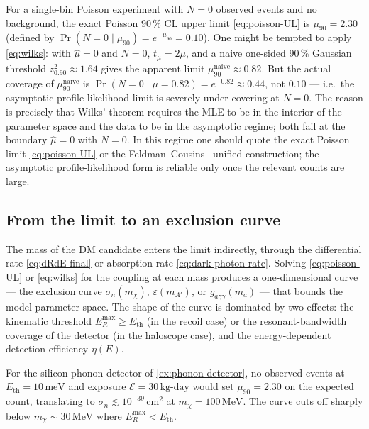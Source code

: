 \begin{example}
\label{ex:limits-compare}
For a single-bin Poisson experiment with $N=0$ observed events
and no background, the exact Poisson 90\,\% CL upper limit
\cref{eq:poisson-UL} is $\mu_{90}=2.30$ (defined by
$\Pr(N=0\mid\mu_{90})=e^{-\mu_{90}}=0.10$). One might be tempted
to apply \cref{eq:wilks}: with $\hat\mu=0$ and $N=0$,
$t_\mu=2\mu$, and a naive one-sided 90\,\% Gaussian threshold
$z_{0.90}^2\approx 1.64$ gives the apparent limit
$\mu_{90}^{\text{naive}}\approx 0.82$. But the actual coverage
of $\mu_{90}^{\text{naive}}$ is
$\Pr(N=0\mid\mu=0.82)=e^{-0.82}\approx 0.44$, not $0.10$ ---
i.e.\ the asymptotic profile-likelihood limit is severely
under-covering at $N=0$. The reason is precisely that Wilks'
theorem requires the MLE to be in the interior of the parameter
space and the data to be in the asymptotic regime; both fail at
the boundary $\hat\mu=0$ with $N=0$. In this regime one should
quote the exact Poisson limit \cref{eq:poisson-UL} or the
Feldman--Cousins~\cite{feldman1998} unified construction; the
asymptotic profile-likelihood form is reliable only once the
relevant counts are large.
\end{example}

\subsection{From the limit to an exclusion curve}
\label{sec:exclusion-curves}

The mass of the DM candidate enters the limit indirectly, through
the differential rate \cref{eq:dRdE-final} or absorption rate
\cref{eq:dark-photon-rate}. Solving \cref{eq:poisson-UL} or
\cref{eq:wilks} for the coupling at each mass produces a
one-dimensional curve --- the exclusion curve $\sigma_n(m_\chi)$,
$\varepsilon(m_{A'})$, or $g_{a\gamma\gamma}(m_a)$ --- that bounds
the model parameter space. The shape of the curve is dominated by
two effects: the kinematic threshold $E_R^\text{max}\geq E_\text{th}$
(in the recoil case) or the resonant-bandwidth coverage of the
detector (in the haloscope case), and the energy-dependent
detection efficiency $\eta(E)$.

\begin{example}
\label{ex:exclusion-sketch}
For the silicon phonon detector of \cref{ex:phonon-detector}, no
observed events at $E_\text{th}=10\,\text{meV}$ and exposure
$\mathcal E=30\,\text{kg-day}$ would set
$\mu_{90}=2.30$ on the expected count, translating to
$\sigma_n\lesssim 10^{-39}\,\text{cm}^2$ at $m_\chi=100\,\text{MeV}$.
The curve cuts off sharply below $m_\chi\sim 30\,\text{MeV}$ where
$E_R^\text{max}<E_\text{th}$.
\end{example}

